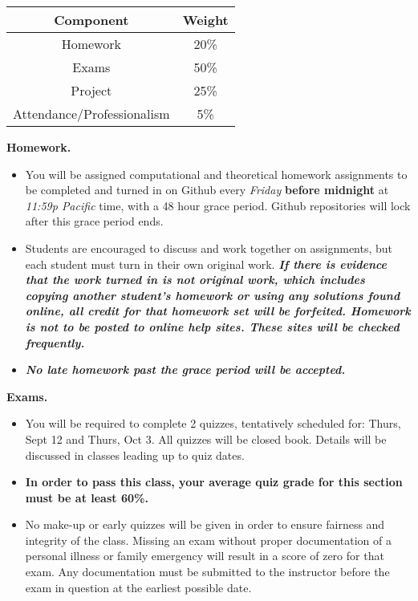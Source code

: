 \documentclass[11pt]{article}
\begin{document}
\vspace{-0.15in}

\begin{center}
	\begin{tabular}{|c|c|}
		\hline
		\textbf{Component} & \textbf{Weight} \\
		\hline
		Homework & 20\%  \\
		Exams & 50\%  \\
		Project & 25\% \\
		Attendance/Professionalism & 5\%\\
		\hline
	\end{tabular}
\end{center}

\noindent \textbf{Homework.}

\begin{itemize}
	\item You will be assigned computational and theoretical homework assignments to be completed and turned in on Github every \textit{Friday} \textbf{before midnight} at \textit{11:59p Pacific} time, with a 48 hour grace period.  Github repositories will lock after this grace period ends. 

\item Students are encouraged to discuss and work together on assignments, but each student must turn in their own original work. \textbf{\textit{If there is evidence that the work turned in is not original work, which includes copying another student’s homework or using any solutions found online, all credit for that homework set will be forfeited. Homework is not to be posted to online help sites. These sites will be checked frequently.}}

\item \textbf{\textit{No late homework past the grace period will be accepted.}}

\end{itemize}


\noindent \textbf{Exams.} 

\begin{itemize}
\item You will be required to complete 2 quizzes, tentatively scheduled for: Thurs, Sept 12 and Thurs, Oct 3.  All quizzes will be closed book. Details will be discussed in classes leading up to quiz dates.

\item \textbf{In order to pass this class, your average quiz grade for this section must be at least 60\%.}

\item No make-up or early quizzes will be given in order to ensure fairness and integrity of the class. Missing an exam without proper documentation of a personal illness or family emergency will result in a score of zero for that exam. Any documentation must be submitted to the instructor before the exam in question at the earliest possible date.
\end{itemize}
\end{document}
